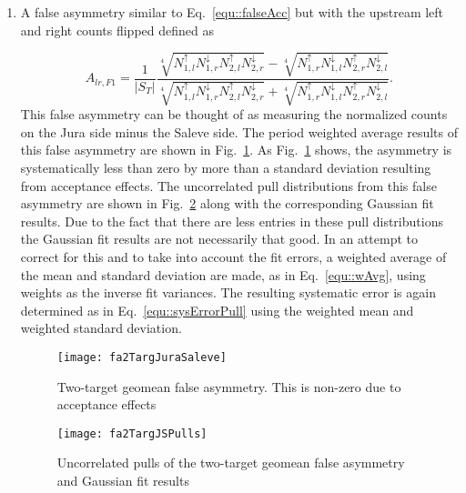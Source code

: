 \begin{enumerate}
  \label{tab::additionalFA}

\item A false asymmetry similar to Eq.~\ref{equ::falseAcc} but with the upstream
  left and right counts flipped defined as
  
  \begin{equation}
    \label{equ::additionalfalseAsym}
    A_{lr, F1} = \frac{1}{|S_T|}
    \frac{
      \sqrt[4]{
        N_{1,l}^\uparrow N_{1,r}^\downarrow N_{2,l}^\uparrow N_{2,r}^\downarrow
      }
      - \sqrt[4]{ N_{1,r}^\uparrow N_{1,l}^\downarrow
        N_{2,r}^\uparrow N_{2, l}^\downarrow }
      }{
      \sqrt[4]{
        N_{1,l}^\uparrow N_{1,r}^\downarrow
        N_{2,l}^\uparrow N_{2, r}^\downarrow
      } + \sqrt[4]{ N_{1,r}^\uparrow N_{1,l}^\downarrow
        N_{2,r}^\uparrow N_{2, l}^\downarrow
      }
    }.
  \end{equation}
  This false asymmetry can be thought of as measuring the normalized counts on
  the Jura side minus the Saleve side.  The period weighted average results of
  this false asymmetry are shown in Fig.~\ref{fig::fa2TargJuraSaleve}.  As
  Fig.~\ref{fig::fa2TargJuraSaleve} shows, the asymmetry is systematically less
  than zero by more than a standard deviation resulting from acceptance effects.
  The uncorrelated pull distributions from this false asymmetry are shown in
  Fig.~\ref{fig::fa2TargJSPulls} along with the corresponding Gaussian fit
  results.  Due to the fact that there are less entries in these pull
  distributions the Gaussian fit results are not necessarily that good.  In an
  attempt to correct for this and to take into account the fit errors, a
  weighted average of the mean and standard deviation are made, as in
  Eq.~\ref{equ::wAvg}, using weights as the inverse fit variances.  The
  resulting systematic error is again determined as in
  Eq.~\ref{equ::sysErrorPull} using the weighted mean and weighted standard
  deviation.

  \begin{figure}[h!t]
    \centering \texttt{[image: fa2TargJuraSaleve]}
    \caption{Two-target geomean false asymmetry.  This is non-zero due to
      acceptance effects}
    \label{fig::fa2TargJuraSaleve}
  \end{figure}
  
  \begin{figure}[h!t]
    \centering \texttt{[image: fa2TargJSPulls]}
    \caption{Uncorrelated pulls of the two-target geomean false asymmetry and
      Gaussian fit results}
    \label{fig::fa2TargJSPulls}
  \end{figure}


\end{enumerate}
